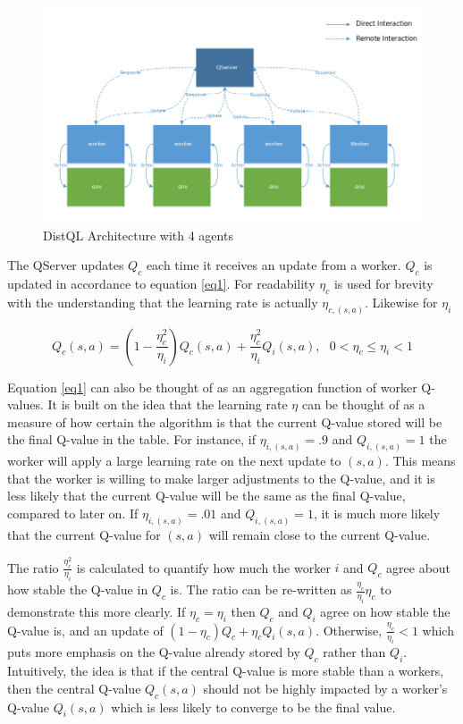 \documentclass[jair,twoside,11pt,theapa]{article}
\begin{document}
\begin{figure}[h]
\centering
\includegraphics[width=0.8\linewidth]{"DistQL Architecture-modified"}
\caption{DistQL Architecture with 4 agents}
\label{fig:DistQLArchitecture}
\end{figure}

The QServer updates $Q_c$ each time it receives an update from a worker. $Q_c$ is updated in accordance to equation \ref{eq1}. For readability $\eta_c$ is used for brevity with the understanding that the learning rate is actually $\eta_{c,(s,a)}$. Likewise for $\eta_i$

\begin{equation}
\label{eq1}
Q_c(s,a) = (1-\frac{\eta_{c}^{2}}{\eta_{i}})Q_c(s,a) + \frac{\eta_{c}^{2}}{\eta_{i}} Q_i(s,a), \text{  } 0 < \eta_{c} \leq \eta_{i} < 1
\end{equation}

Equation \ref{eq1} can also be thought of as an aggregation function of worker Q-values. It is built on the idea that the learning rate $\eta$ can be thought of as a measure of how certain the algorithm is that the current Q-value stored will be the final Q-value in the table. For instance, if $\eta_{i,(s,a)} = .9$ and $Q_{i,(s,a)} = 1$ the worker will apply a large learning rate on the next update to $(s,a)$. This means that the worker is willing to make larger adjustments to the Q-value, and it is less likely that the current Q-value will be the same as the final Q-value, compared to later on. If $\eta_{i,(s,a)} = .01$ and $Q_{i,(s,a)} = 1$, it is much more likely that the current Q-value for $(s,a)$ will remain close to the current Q-value. 

The ratio $\frac{\eta_{c}^{2}}{\eta_{i}}$ is calculated to quantify how much the worker $i$ and $Q_c$ agree about how stable the Q-value in $Q_c$ is. The ratio can be re-written as $\frac{\eta_{c}}{\eta_{i}} \eta_{c}$ to demonstrate this more clearly. If $\eta_{c} = \eta_{i}$ then $Q_c$ and $Q_i$ agree on how stable the Q-value is, and an update of $(1-\eta_{c})Q_c + \eta_{c} Q_i(s,a)$. Otherwise, $\frac{\eta_c}{\eta_i} < 1$ which puts more emphasis on the Q-value already stored by $Q_c$ rather than $Q_i$. Intuitively, the idea is that if the central Q-value is more stable than a workers, then the central Q-value $Q_c(s,a)$ should not be highly impacted by a worker's Q-value $Q_i(s,a)$ which is less likely to converge to be the final value.
\end{document}
